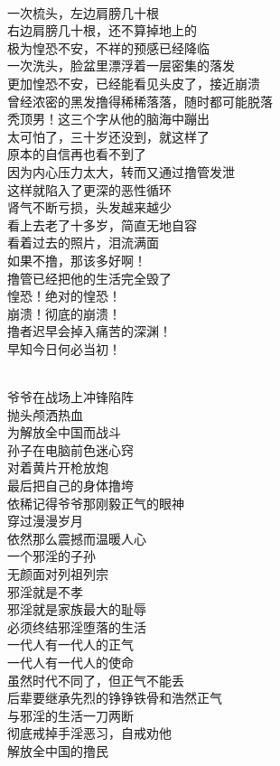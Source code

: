 \begin{poem}[头发撸没了]
    \begin{multicols}{2}
        \centering~\\
        一次梳头，左边肩膀几十根 \\ 右边肩膀几十根，还不算掉地上的 \\ 极为惶恐不安，不祥的预感已经降临 \\ 一次洗头，脸盆里漂浮着一层密集的落发 \\ 更加惶恐不安，已经能看见头皮了，接近崩溃 \\ 曾经浓密的黑发撸得稀稀落落，随时都可能脱落 \\ 秃顶男！这三个字从他的脑海中蹦出 \\ 太可怕了，三十岁还没到，就这样了 \\ 原本的自信再也看不到了 \\ 因为内心压力太大，转而又通过撸管发泄 \\ 这样就陷入了更深的恶性循环 \\ 肾气不断亏损，头发越来越少 \\ 看上去老了十多岁，简直无地自容 \\ 看着过去的照片，泪流满面 \\ 如果不撸，那该多好啊！ \\ 撸管已经把他的生活完全毁了 \\ 惶恐！绝对的惶恐！ \\ 崩溃！彻底的崩溃！ \\ 撸者迟早会掉入痛苦的深渊！ \\ 早知今日何必当初！
    \end{multicols}
\end{poem}

\begin{poem}[两代人]
    \begin{multicols}{2}
        \centering~\\
        爷爷在战场上冲锋陷阵 \\ 抛头颅洒热血 \\ 为解放全中国而战斗 \\ 孙子在电脑前色迷心窍 \\ 对着黄片开枪放炮 \\ 最后把自己的身体撸垮 \\ 依稀记得爷爷那刚毅正气的眼神 \\ 穿过漫漫岁月 \\ 依然那么震撼而温暖人心 \\ 一个邪淫的子孙 \\ 无颜面对列祖列宗 \\ 邪淫就是不孝 \\ 邪淫就是家族最大的耻辱 \\ 必须终结邪淫堕落的生活 \\ 一代人有一代人的正气 \\ 一代人有一代人的使命 \\ 虽然时代不同了，但正气不能丢 \\ 后辈要继承先烈的铮铮铁骨和浩然正气 \\ 与邪淫的生活一刀两断 \\ 彻底戒掉手淫恶习，自戒劝他 \\ 解放全中国的撸民
    \end{multicols}
\end{poem}


